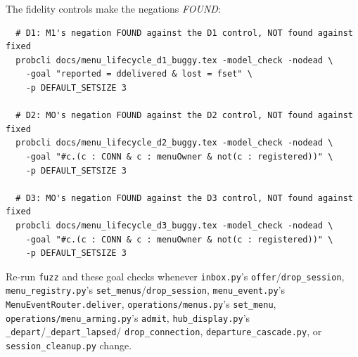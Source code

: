\documentclass[a4paper,10pt,fleqn]{article}
\begin{document}
The fidelity controls make the negations \emph{FOUND}:

\begin{verbatim}
  # D1: M1's negation FOUND against the D1 control, NOT found against fixed
  probcli docs/menu_lifecycle_d1_buggy.tex -model_check -nodead \
    -goal "reported = ddelivered & lost = fset" \
    -p DEFAULT_SETSIZE 3

  # D2: MO's negation FOUND against the D2 control, NOT found against fixed
  probcli docs/menu_lifecycle_d2_buggy.tex -model_check -nodead \
    -goal "#c.(c : CONN & c : menuOwner & not(c : registered))" \
    -p DEFAULT_SETSIZE 3

  # D3: MO's negation FOUND against the D3 control, NOT found against fixed
  probcli docs/menu_lifecycle_d3_buggy.tex -model_check -nodead \
    -goal "#c.(c : CONN & c : menuOwner & not(c : registered))" \
    -p DEFAULT_SETSIZE 3
\end{verbatim}

Re-run \texttt{fuzz} and these goal checks whenever \texttt{inbox.py}'s
\texttt{offer}/\texttt{drop\_session}, \texttt{menu\_registry.py}'s
\texttt{set\_menus}/\texttt{drop\_session}, \texttt{menu\_event.py}'s
\texttt{MenuEventRouter.deliver}, \texttt{operations/menus.py}'s
\texttt{set\_menu}, \texttt{operations/menu\_arming.py}'s \texttt{admit},
\texttt{hub\_display.py}'s \texttt{\_depart}/\texttt{\_depart\_lapsed}/
\texttt{drop\_connection}, \texttt{departure\_cascade.py}, or
\texttt{session\_cleanup.py} change.
\end{document}
